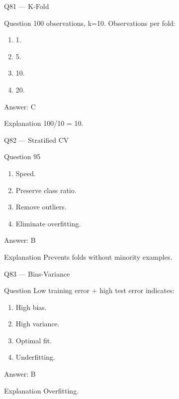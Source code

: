 \documentclass[aspectratio=169,8pt]{beamer}
\begin{document}
	\begin{frame}{Q81 --- K-Fold}
		\begin{block}{Question}
			100 observations, k=10. Observations per fold:
		\end{block}
		\begin{enumerate}
			\item 1.
			\item 5.
			\item 10.
			\item 20.
		\end{enumerate}
		\begin{exampleblock}{Answer: C}\end{exampleblock}
		\begin{block}{Explanation}
			100/10 = 10.
		\end{block}
	\end{frame}
	
	\begin{frame}{Q82 --- Stratified CV}
		\begin{block}{Question}
			95%
		\end{block}
		\begin{enumerate}
			\item Speed.
			\item Preserve class ratio.
			\item Remove outliers.
			\item Eliminate overfitting.
		\end{enumerate}
		\begin{exampleblock}{Answer: B}\end{exampleblock}
		\begin{block}{Explanation}
			Prevents folds without minority examples.
		\end{block}
	\end{frame}
	
	\begin{frame}{Q83 --- Bias-Variance}
		\begin{block}{Question}
			Low training error + high test error indicates:
		\end{block}
		\begin{enumerate}
			\item High bias.
			\item High variance.
			\item Optimal fit.
			\item Underfitting.
		\end{enumerate}
		\begin{exampleblock}{Answer: B}\end{exampleblock}
		\begin{block}{Explanation}
			Overfitting.
		\end{block}
	\end{frame}
	
\end{document}
